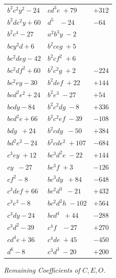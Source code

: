 \documentclass[11pt,a4paper]{article}
\begin{document}
\begin{tabular}{|l||l|l|}
$b^{2}c^{2}y^{2}-24$ & $cd^{3}e\;+79$ & $+312$\\
$b^{2}de^{2}y+60$ & $d^{5}\;\;\;-24$ & $-64$\\
$b^{2}c^{4}-27$ & $a^{2}b^{3}y\;-2$ & \\
$bcy^{2}d+6$ & $b^{2}ceg\;+5$ & \\
$bc^{2}deg-42$ & $b^{2}cf^{2}\;+6$ & \\
$bc^{2}df^{2}+60$ & $b^{2}c^{2}g\;+2$ & $-224$\\
$bc^{2}ey-30$ & $b^{2}def\;+22$ & $+144$\\
$bcd^{2}e^{2}+24$ & $b^{2}e^{3}\;-27$ & $+54$\\
$bcdy-84$ & $b^{2}c^{2}dg\;-8$ & $+336$\\
$bcd^{2}e+66$ & $b^{2}c^{2}ef\;-39$ & $-108$\\
$bdy\;\;+24$ & $b^{2}cdy\;\;-50$ & $+384$\\
$bd^{2}e^{2}-24$ & $b^{2}cde^{2}\;+107$ & $-684$\\
$c^{3}ey\;+12$ & $bc^{3}d^{2}e\;-22$ & $+144$\\
$cy\;\;-27$ & $bc^{3}f\;+3$ & $-126$\\
$cf^{2}-8$ & $bc^{3}dy\;\;+84$ & $-648$\\
$c^{3}def+66$ & $bc^{2}d^{3}\;\;-21$ & $+432$\\
$c^{3}e^{3}-8$ & $bc^{2}d^{2}h\;-102$ & $+564$\\
$c^{3}dy-24$ & $bcd^{4}\;\;+44$ & $-288$\\
$c^{3}d^{2}-39$ & $c^{4}f\;\;\;-27$ & $+270$\\
$cd^{4}e+36$ & $c^{4}de\;+45$ & $-450$\\
$d^{6}-8$ & $c^{3}d^{3}\;-20$ & $+200$\\
\hline
\end{tabular}

\newpage
\begin{center}
\textit{Remaining Coefficients of $C,E,O$.}
\end{center}
\end{document}
